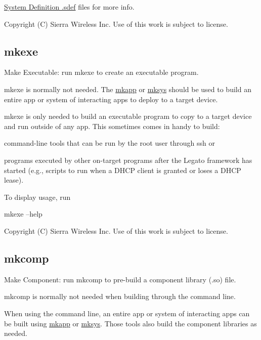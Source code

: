 \hyperlink{defFilesSdef}{System Definition .sdef} files for more info.





Copyright (C) Sierra Wireless Inc. Use of this work is subject to license. \hypertarget{buildToolsmkexe}{}\subsection{mkexe}\label{buildToolsmkexe}
Make Executable\+: run {\ttfamily mkexe} to create an executable program.

{\ttfamily mkexe} is normally not needed. The \hyperlink{buildToolsmkapp}{mkapp} or \hyperlink{buildToolsmksys}{mksys} should be used to build an entire app or system of interacting apps to deploy to a target device.

{\ttfamily mkexe} is only needed to build an executable program to copy to a target device and run outside of any app. This sometimes comes in handy to build\+:
\begin{DoxyItemize}
\item command-\/line tools that can be run by the root user through {\ttfamily ssh} or
\item programs executed by other on-\/target programs after the Legato framework has started (e.\+g., scripts to run when a D\+H\+C\+P client is granted or loses a D\+H\+C\+P lease).
\end{DoxyItemize}

To display usage, run \begin{DoxyVerb}mkexe --help\end{DoxyVerb}






Copyright (C) Sierra Wireless Inc. Use of this work is subject to license. \hypertarget{buildToolsmkcomp}{}\subsection{mkcomp}\label{buildToolsmkcomp}
Make Component\+: run {\ttfamily mkcomp} to pre-\/build a component library ({\ttfamily .so}) file.

{\ttfamily mkcomp} is normally not needed when building through the command line.

When using the command line, an entire app or system of interacting apps can be built using \hyperlink{buildToolsmkapp}{mkapp} or \hyperlink{buildToolsmksys}{mksys}. Those tools also build the component libraries as needed.

